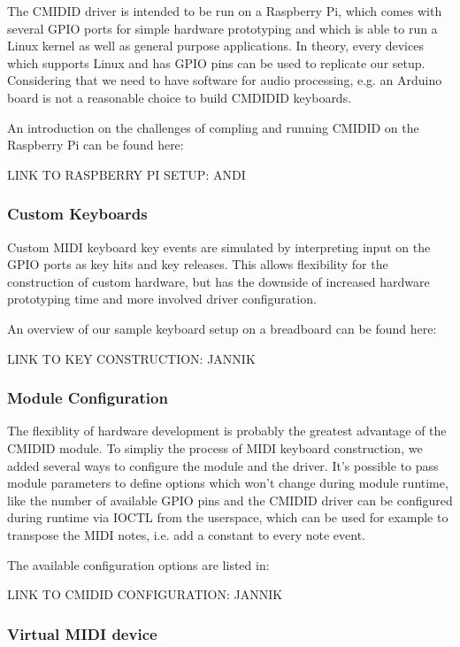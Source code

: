 \documentclass{sig-alternate}
\begin{document}
The CMIDID driver is intended to be run on a Raspberry Pi, which comes with 
several GPIO ports for simple hardware prototyping and which is able to run 
a Linux kernel as well as general purpose applications. In theory, every 
devices which supports Linux and has GPIO pins can be used to replicate our 
setup. Considering that we need to have software for audio processing, e.g.
an Arduino board is not a reasonable choice to build CMDIDID keyboards.

An introduction on the challenges of compling and running CMIDID on the 
Raspberry Pi can be found here:

LINK TO RASPBERRY PI SETUP: ANDI

\subsubsection{Custom Keyboards}
\label{cmidid:keyboards}

Custom MIDI keyboard key events are simulated by interpreting input on the 
GPIO ports as key hits and key releases. This allows flexibility for the 
construction of custom hardware, but has the downside of increased hardware 
prototyping time and more involved driver configuration.

An overview of our sample keyboard setup on a breadboard can be found here:

LINK TO KEY CONSTRUCTION: JANNIK

\subsubsection{Module Configuration}
\label{cmidid:configuration}

The flexiblity of hardware development is probably the greatest advantage of 
the CMIDID module. To simpliy the process of MIDI keyboard construction, we 
added several ways to configure the module and the driver. It's possible to 
pass module parameters to define options which won't change during module 
runtime, like the number of available GPIO pins and the CMIDID driver can 
be configured during runtime via IOCTL from the userspace, which can be used 
for example to transpose the MIDI notes, i.e. add a constant to every note 
event.

The available configuration options are listed in:

LINK TO CMIDID CONFIGURATION: JANNIK

\subsubsection{Virtual MIDI device}
\label{cmidid:midi}
\end{document}
